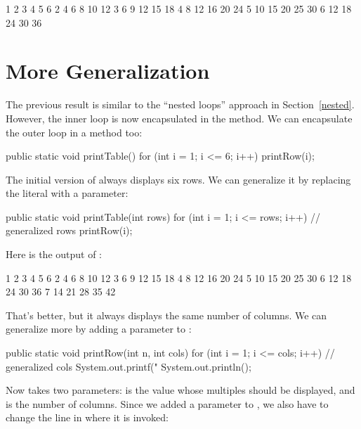\begin{stdout}
   1   2   3   4   5   6
   2   4   6   8  10  12
   3   6   9  12  15  18
   4   8  12  16  20  24
   5  10  15  20  25  30
   6  12  18  24  30  36
\end{stdout}



\section{More Generalization}

The previous result is similar to the ``nested loops'' approach in Section~\ref{nested}.
However, the inner loop is now encapsulated in the  method.
We can encapsulate the outer loop in a method too:

\begin{code}
public static void printTable() {
    for (int i = 1; i <= 6; i++) {
        printRow(i);
    }
}
\end{code}

The initial version of  always displays six rows.
We can generalize it by replacing the literal  with a parameter:

\begin{code}
public static void printTable(int rows) {
    for (int i = 1; i <= rows; i++) {     // generalized rows
        printRow(i);
    }
}
\end{code}

Here is the output of :

\begin{stdout}
   1   2   3   4   5   6
   2   4   6   8  10  12
   3   6   9  12  15  18
   4   8  12  16  20  24
   5  10  15  20  25  30
   6  12  18  24  30  36
   7  14  21  28  35  42
\end{stdout}

That's better, but it always displays the same number of columns.
We can generalize more by adding a parameter to :

\begin{code}
public static void printRow(int n, int cols) {
    for (int i = 1; i <= cols; i++) {     // generalized cols
        System.out.printf("%
    }
    System.out.println();
}
\end{code}

Now  takes two parameters:  is the value whose multiples should be displayed, and  is the number of columns.
Since we added a parameter to , we also have to change the line in  where it is invoked:

